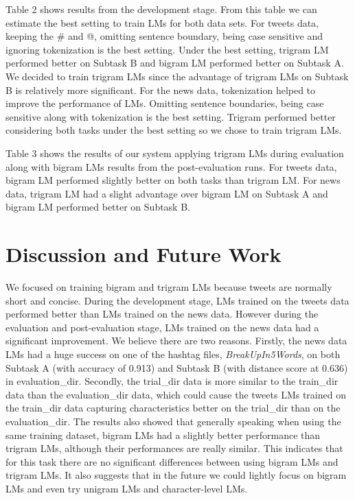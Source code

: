 \documentclass[11pt,a4paper]{article}
\begin{document}
Table 2 shows results from the development stage. From this table we can estimate the best setting to train LMs for both data sets. For tweets data, keeping the \# and @, omitting sentence boundary, being case sensitive and ignoring tokenization is the best setting. Under the best setting, trigram LM performed better on Subtask B and bigram LM performed better on Subtask A. We decided to train trigram LMs since the advantage of trigram LMs on Subtask B is relatively more significant. For the news data, tokenization helped to improve the performance of LMs. Omitting sentence boundaries, being case sensitive along with tokenization is the best setting. Trigram performed better considering both tasks under the best setting so we chose to train trigram LMs.

Table 3 shows the results of our system applying trigram LMs during evaluation along with bigram LMs results from the post-evaluation runs. For tweets data, bigram LM performed slightly better on both tasks than trigram LM. For news data, trigram LM had a slight advantage over bigram LM on Subtask A and bigram LM performed better on Subtask B. 


\section{Discussion and Future Work}
We focused on training bigram and trigram LMs because tweets are normally short and concise. During the development stage, LMs trained on the tweets data performed better than LMs trained on the news data. However during the evaluation and post-evaluation stage, LMs trained on the news data had a significant improvement. We believe there are two reasons. Firstly, the news data LMs had a huge success on one of the hashtag files, \textit{BreakUpIn5Words}, on both Subtask A (with accuracy of 0.913) and Subtask B (with distance score at 0.636) in evaluation\_dir. Secondly, the trial\_dir data is more similar to the train\_dir data than the evaluation\_dir data, which could cause the tweets LMs trained on the train\_dir data capturing characteristics better on the trial\_dir than on the evaluation\_dir. The results also showed that generally speaking when using the same training dataset, bigram LMs had a slightly better performance than trigram LMs, although their performances are really similar. This indicates that for this task there are no significant differences between using bigram LMs and trigram LMs. It also suggests that in the future we could lightly focus on bigram LMs and even try unigram LMs and character-level LMs.
\end{document}
